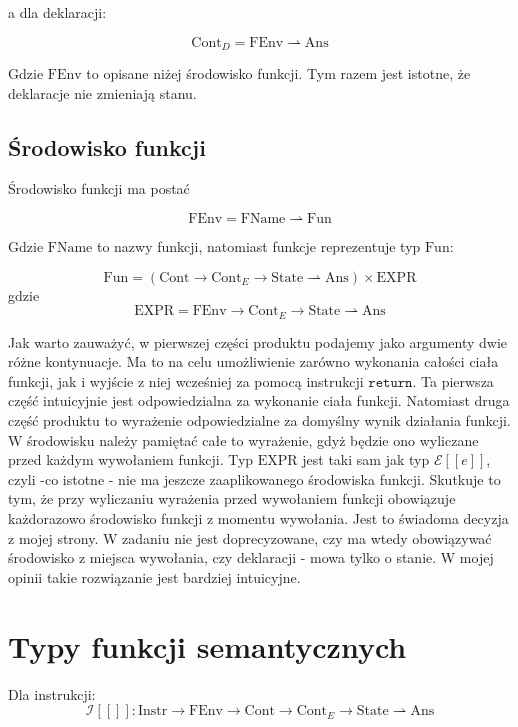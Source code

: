 \documentclass[a4paper]{article}
\begin{document}
a dla deklaracji:

$$
\text{Cont}_D = \text{FEnv} \rightharpoonup \text{Ans}
$$

Gdzie $\text{FEnv}$ to opisane niżej środowisko funkcji. Tym razem jest istotne, że deklaracje nie zmieniają stanu.

\subsection*{Środowisko funkcji}

Środowisko funkcji ma postać

$$
\text{FEnv} = \text{FName} \rightharpoonup \text{Fun}
$$

Gdzie $\text{FName}$ to nazwy funkcji, natomiast funkcje reprezentuje typ $\text{Fun}$:

$$
\text{Fun} = (\text{Cont} \longrightarrow \text{Cont}_E \longrightarrow \text{State} \rightharpoonup \text{Ans}) \times \text{EXPR}
$$
gdzie
$$
\text{EXPR} = \text{FEnv} \longrightarrow \text{Cont}_E \longrightarrow \text{State} \rightharpoonup \text{Ans}
$$

Jak warto zauważyć, w pierwszej części produktu podajemy jako argumenty dwie różne kontynuacje. Ma to na celu umożliwienie zarówno wykonania całości ciała funkcji, jak i wyjście z niej wcześniej za pomocą instrukcji $\texttt{return}$. Ta pierwsza część intuicyjnie jest odpowiedzialna za wykonanie ciała funkcji. Natomiast druga część produktu to wyrażenie odpowiedzialne za domyślny wynik działania funkcji. W środowisku należy pamiętać całe to wyrażenie, gdyż będzie ono wyliczane przed każdym wywołaniem funkcji. Typ $\text{EXPR}$ jest taki sam jak typ $\mathcal{E}[\![ e ]\!]$, czyli -co istotne - nie ma jeszcze zaaplikowanego środowiska funkcji. Skutkuje to tym, że przy wyliczaniu wyrażenia przed wywołaniem funkcji obowiązuje każdorazowo środowisko funkcji z momentu wywołania. Jest to świadoma decyzja z mojej strony. W zadaniu nie jest doprecyzowane, czy ma wtedy obowiązywać środowisko z miejsca wywołania, czy deklaracji - mowa tylko o stanie. W mojej opinii takie rozwiązanie jest bardziej intuicyjne.


\section*{Typy funkcji semantycznych}

Dla instrukcji:
$$
\mathcal{I}[\![]\!]: \text{Instr} \longrightarrow \text{FEnv} \longrightarrow \text{Cont} \longrightarrow \text{Cont}_E \longrightarrow \text{State} \rightharpoonup \text{Ans}
$$
\end{document}
